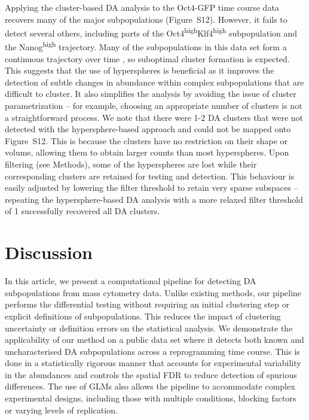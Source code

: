 \documentclass{article}
\newcommand{\suppfigclusterreal}{S12}
\begin{document}
Applying the cluster-based DA analysis to the Oct4-GFP time course data recovers many of the major subpopulations (Figure~\suppfigclusterreal{}).
However, it fails to detect several others, including parts of the Oct4\textsuperscript{high}Klf4\textsuperscript{high} subpopulation and the Nanog\textsuperscript{high} trajectory.
Many of the subpopulations in this data set form a continuous trajectory over time \cite{zunder2015continuous}, so suboptimal cluster formation is expected.
This suggests that the use of hyperspheres is beneficial as it improves the detection of subtle changes in abundance within complex subpopulations that are difficult to cluster.
It also simplifies the analysis by avoiding the issue of cluster parametrization -- for example, choosing an appropriate number of clusters is not a straightforward process.
We note that there were 1-2 DA clusters that were not detected with the hypersphere-based approach and could not be mapped onto Figure~\suppfigclusterreal{}.
This is because the clusters have no restriction on their shape or volume, allowing them to obtain larger counts than most hyperspheres.
Upon filtering (see Methods), some of the hyperspheres are lost while their corresponding clusters are retained for testing and detection.
This behaviour is easily adjusted by lowering the filter threshold to retain very sparse subspaces -- repeating the hypersphere-based DA analysis with a more relaxed filter threshold of 1 successfully recovered all DA clusters.

\section{Discussion}
In this article, we present a computational pipeline for detecting DA subpopulations from mass cytometry data.
Unlike existing methods, our pipeline performs the differential testing without requiring an initial clustering step or explicit definitions of subpopulations.
This reduces the impact of clustering uncertainty or definition errors on the statistical analysis.
We demonstrate the applicability of our method on a public data set where it detects both known and uncharacterised DA subpopulations across a reprogramming time course.
This is done in a statistically rigorous manner that accounts for experimental variability in the abundances and controls the spatial FDR to reduce detection of spurious differences.
The use of GLMs also allows the pipeline to accommodate complex experimental designs, including those with multiple conditions, blocking factors or varying levels of replication.
\end{document}
